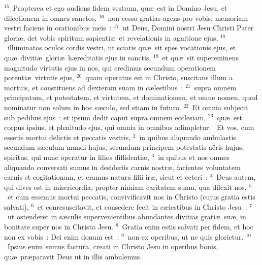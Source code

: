 ${}^{15}$~Propterea et ego audiens fidem vestram, qu\ae\ est in Domino Jesu, et dilectionem in omnes sanctos,
${}^{16}$~non cesso gratias agens pro vobis, memoriam vestri faciens in orationibus meis~:
${}^{17}$~ut Deus, Domini nostri Jesu Christi Pater glori\ae , det vobis spiritum sapienti\ae\ et revelationis in agnitione ejus,
${}^{18}$~illuminatos oculos cordis vestri, ut sciatis qu\ae\ sit spes vocationis ejus, et qu\ae\ diviti\ae\ glori\ae\ h\ae reditatis ejus in sanctis,
${}^{19}$~et qu\ae\ sit supereminens magnitudo virtutis ejus in nos, qui credimus secundum operationem potenti\ae\ virtutis ejus,
${}^{20}$~quam operatus est in Christo, suscitans illum a mortuis, et constituens ad dexteram suam in c\ae lestibus~:
${}^{21}$~supra omnem principatum, et potestatem, et virtutem, et dominationem, et omne nomen, quod nominatur non solum in hoc s\ae culo, sed etiam in futuro.
${}^{22}$~Et omnia subjecit sub pedibus ejus~: et ipsum dedit caput supra omnem ecclesiam,
${}^{23}$~qu\ae\ est corpus ipsius, et plenitudo ejus, qui omnia in omnibus adimpletur.
~Et vos, cum essetis mortui delictis et peccatis vestris,
${}^{2}$~in quibus aliquando ambulastis secundum s\ae culum mundi hujus, secundum principem potestatis a\"eris hujus, spiritus, qui nunc operatur in filios diffidenti\ae ,
${}^{3}$~in quibus et nos omnes aliquando conversati sumus in desideriis carnis nostr\ae , facientes voluntatem carnis et cogitationum, et eramus natura filii ir\ae , sicut et ceteri~:
${}^{4}$~Deus autem, qui dives est in misericordia, propter nimiam caritatem suam, qua dilexit nos,
${}^{5}$~et cum essemus mortui peccatis, convivificavit nos in Christo (cujus gratia estis salvati),
${}^{6}$~et conresuscitavit, et consedere fecit in c\ae lestibus in Christo Jesu~:
${}^{7}$~ut ostenderet in s\ae culis supervenientibus abundantes divitias grati\ae\ su\ae , in bonitate super nos in Christo Jesu.
${}^{8}$~Gratia enim estis salvati per fidem, et hoc non ex vobis~: Dei enim donum est~:
${}^{9}$~non ex operibus, ut ne quis glorietur.
${}^{10}$~Ipsius enim sumus factura, creati in Christo Jesu in operibus bonis, qu\ae\ pr\ae paravit Deus ut in illis ambulemus.


